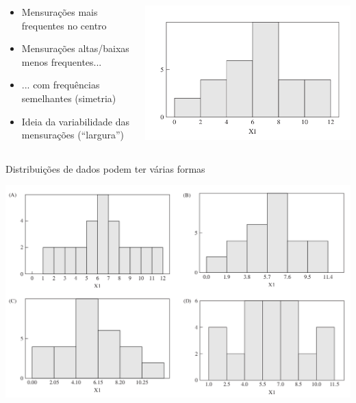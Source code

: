 \documentclass{beamer}
\begin{document}
\begin{frame}
  \begin{columns}
    \begin{column}{.5\textwidth}
      \begin{itemize}
        \tiny
      \item<2> Mensurações mais frequentes no centro
      \item<3,4> Mensurações altas/baixas menos frequentes...
      \item<4> ... com frequências semelhantes (simetria)
      \item<5> Ideia da variabilidade das mensurações (``largura'')
      \end{itemize}
    \end{column}
    \begin{column}{.5\textwidth}
      \begin{center}
        \includegraphics[width=1.35\textwidth]{EDA/eda-histograma1}
      \end{center}
    \end{column}
  \end{columns}
\end{frame}

\begin{frame}
  \begin{exampleblock}{\scriptsize Distribuições de dados podem ter várias formas}
    \begin{center}
      \includegraphics[width=1\textwidth]{EDA/eda-histograma2}
    \end{center}
  \end{exampleblock}
\end{frame}
\end{document}
